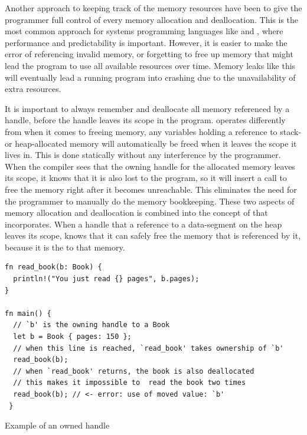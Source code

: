 Another approach to keeping track of the memory resources have been to give the programmer full control of every memory allocation and deallocation.
This is the most common approach for systems programming languages like {\C} and {\Cpp}, where performance and predictability is important.
However, it is easier to make the error of referencing invalid memory, or forgetting to free up memory that might lead the program to use all available resources over time.
Memory leaks like this will eventually lead a running program into crashing due to the unavailability of extra resources.

It is important to always remember and deallocate all memory referenced by a handle, before the handle leaves its scope in the program.
{\rust} operates differently from {\C} when it comes to freeing memory, any variables holding a reference to stack- or heap-allocated memory will automatically be freed when it leaves the scope it lives in.
This is done statically without any interference by the programmer.
When the compiler sees that the owning handle for the allocated memory leaves its scope, it knows that it is also lost to the program, so it will insert a call to free the memory right after it becomes unreachable.
This eliminates the need for the programmer to manually do the memory bookkeeping.
These two aspects of memory allocation and deallocation is combined into the concept of  that {\rust} incorporates.
When a handle that  a reference to a data-segment on the heap leaves its scope, {\rust} knows that it can safely free the memory that is referenced by it, because it is the  to that memory.

\begin{listing}[tb]
\begin{verbatim}
fn read_book(b: Book) {
  println!("You just read {} pages", b.pages);
}

fn main() {
  // `b' is the owning handle to a Book
  let b = Book { pages: 150 };
  // when this line is reached, `read_book' takes ownership of `b'
  read_book(b);
  // when `read_book' returns, the book is also deallocated
  // this makes it impossible to  read the book two times
  read_book(b); // <- error: use of moved value: `b'
 }
\end{verbatim}
\caption{Example of an owned handle}
\label{lst:owning_handle}
\end{listing}

